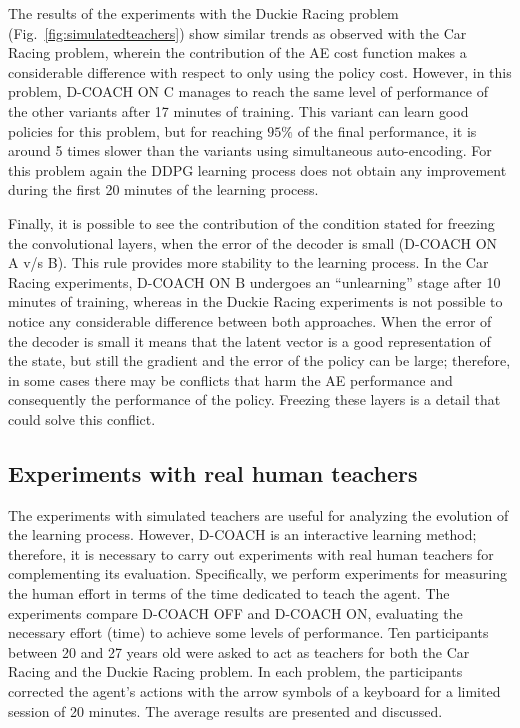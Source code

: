 The results of the experiments with the Duckie Racing problem (Fig.~\ref{fig:simulatedteachers}) show similar trends as observed with the Car Racing problem, wherein the contribution of the AE cost function makes a considerable difference with respect to only using the policy cost. However, in this problem, D-COACH ON C manages to reach the same level of performance of the other variants after 17 minutes of training. This variant can learn good policies for this problem, but for reaching $95\%$ of the final performance, it is around 5 times slower than the variants using simultaneous auto-encoding. For this problem again the DDPG learning process does not obtain any improvement during the first 20 minutes of the learning process. 

Finally, it is possible to see the contribution of the condition stated for freezing the convolutional layers, when the error of the decoder is small (D-COACH ON A v/s B). This rule provides more stability to the learning process. In the Car Racing experiments, $\text{D-COACH ON B}$ undergoes an ``unlearning'' stage after 10 minutes of training, whereas in the Duckie Racing experiments is not possible to notice any considerable difference between both approaches. When the error of the decoder is small it means that the latent vector is a good representation of the state, but still the gradient and the error of the policy can be large; therefore, in some cases there may be conflicts that harm the AE performance and consequently the performance of the policy. Freezing these layers is a detail that could solve this conflict.

\subsection{Experiments with real human teachers}

The experiments with simulated teachers are useful for analyzing the evolution of the learning process. However, D-COACH is an interactive learning method; therefore, it is necessary to carry out experiments with real human teachers for complementing its evaluation. Specifically, we perform experiments for measuring the human effort in terms of the time dedicated to teach the agent. The experiments compare D-COACH OFF and D-COACH ON, evaluating the necessary effort (time) to achieve some levels of performance. Ten participants between 20 and 27 years old were asked to act as teachers for both the Car Racing and the Duckie Racing problem. In each problem, the participants corrected the agent's actions with the arrow symbols of a keyboard for a limited session of 20 minutes. 
The average results are presented and discussed.

